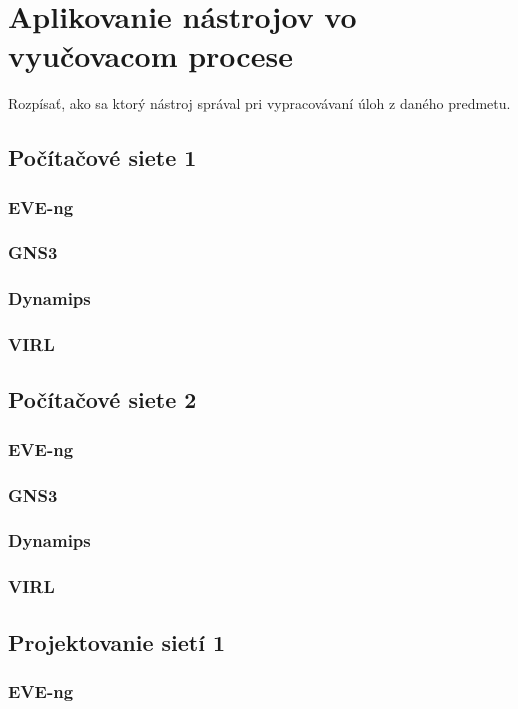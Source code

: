 \chapter{Aplikovanie nástrojov vo vyučovacom procese}

Rozpísať, ako sa ktorý nástroj správal pri vypracovávaní úloh z daného predmetu.

\section{Počítačové siete 1}
\subsection{EVE-ng}
\subsection{GNS3}
\subsection{Dynamips}
\subsection{VIRL}

\clearpage

\section{Počítačové siete 2}
\subsection{EVE-ng}
\subsection{GNS3}
\subsection{Dynamips}
\subsection{VIRL}

\clearpage

\section{Projektovanie sietí 1}
\subsection{EVE-ng}

